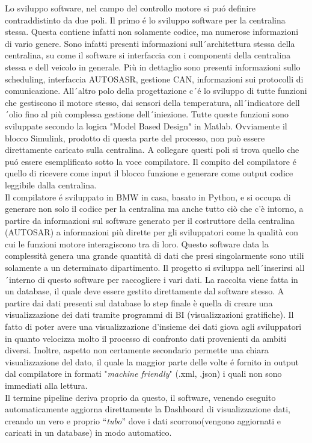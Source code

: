 \documentclass[../main.tex]{subfiles}
\begin{document}
Lo sviluppo software, nel campo del controllo motore si puó definire contraddistinto da due poli. Il primo é lo sviluppo software per la centralina stessa. Questa contiene infatti non solamente codice, ma numerose informazioni di vario genere. Sono infatti presenti informazioni sull´architettura stessa della centralina, su come il software si interfaccia con i componenti della centralina stessa e dell veicolo in generale. Più in dettaglio sono presenti informazioni sullo scheduling, interfaccia AUTOSASR,  gestione CAN, informazioni sui protocolli di comunicazione. All´altro polo della progettazione c´é lo sviluppo di tutte funzioni che  gestiscono il motore stesso, dai sensori della temperatura, all´indicatore dell´olio fino al più complessa gestione dell´iniezione. Tutte queste funzioni sono sviluppate secondo la logica "Model Based Design" in Matlab. Ovviamente il blocco Simulink, prodotto di questa parte del processo, non può essere direttamente caricato sulla centralina. A collegare questi poli si trova quello che puó essere esemplificato sotto la voce compilatore. Il compito del compilatore é quello di ricevere come input il blocco funzione e generare come output codice leggibile dalla centralina.\\ Il compilatore é sviluppato in BMW in casa, basato in Python, e si occupa di generare non solo il codice per la centralina ma anche tutto ciò che c'è intorno, a partire da informazioni sul software generato per il costruttore della centralina (AUTOSAR) a informazioni più dirette per gli sviluppatori come la qualità con cui le funzioni motore interagiscono tra di loro. Questo software data la complessità genera una grande quantità di dati che presi singolarmente sono utili solamente a un determinato dipartimento. Il progetto si sviluppa nell´inserirsi all´interno di questo software per raccogliere i vari dati. La raccolta viene fatta in un database, il quale deve essere gestito direttamente dal software stesso. A partire dai dati presenti sul database lo step finale è quella di creare una visualizzazione dei dati tramite programmi di BI (visualizzazioni gratifiche). Il fatto di poter avere una visualizzazione d'insieme dei dati giova agli sviluppatori in quanto velocizza molto il processo di confronto dati provenienti da ambiti diversi. Inoltre, aspetto non certamente secondario permette una chiara visualizzazione del dato, il quale la maggior parte delle volte é fornito in output dal compilatore in formati "\textit{machine friendly}" (.xml, .json) i quali non sono immediati alla lettura.\\Il termine pipeline deriva proprio da questo, il software, venendo eseguito automaticamente aggiorna direttamente la Dashboard di visualizzazione dati, creando un vero e proprio “\textit{tubo}” dove i dati scorrono(vengono aggiornati e caricati in un database) in modo automatico. 

\cleardoublepage
\end{document}
